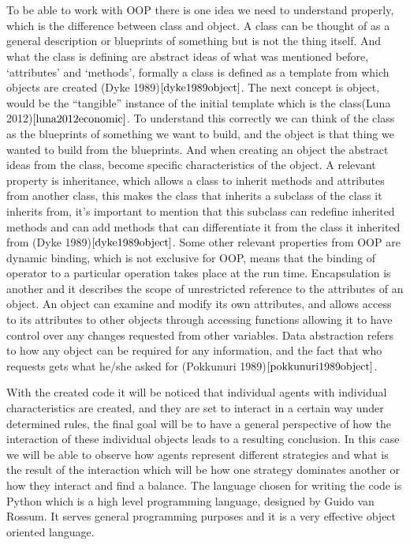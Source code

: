 \documentclass{article}
\begin{document}
\\\\To be able to work with OOP there is one idea we need to understand properly, which is the difference between class and object. A class can be thought of as a general description or blueprints of something but is not the thing itself.  And what the class is defining are abstract ideas of what was mentioned before, `attributes’ and `methods’, formally a class is defined as a template from which objects are created (Dyke 1989)$\cite{dyke1989object}$. The next concept is object,  would be the ``tangible'' instance of the initial template which is the class(Luna 2012)$\cite{luna2012economic}$. To understand this correctly we can think of the class as the blueprints of something we want to build, and the object is that thing we wanted to build from the blueprints. And when creating an object the abstract ideas from the class, become specific characteristics of the object. A relevant property is inheritance, which allows a class to inherit methods and attributes from another class, this makes the class that inherits a subclass of the class it inherits from, it’s important to mention that this subclass can redefine inherited methods and can add methods that can differentiate it from the class it inherited from (Dyke 1989)$\cite{dyke1989object}$.  Some other relevant properties from OOP are dynamic binding, which is not exclusive for OOP, means that the binding of operator to a particular operation takes place at the run time. Encapsulation is another and it describes the scope of unrestricted reference to the attributes of an object. An object can examine and modify its own attributes, and allows access to its attributes to other objects through accessing functions allowing it to have control over any changes requested from other variables. Data abstraction refers to how any object can be required for any information, and the fact that who requests gets what he/she asked for (Pokkunuri 1989)$\cite{pokkunuri1989object}$. 

With the created code it will be noticed that individual agents with individual characteristics are created, and they are set to interact in a certain way under determined rules, the final goal will be to have a general perspective of how the interaction of these individual objects leads to a resulting conclusion. In this case we will be able to observe how agents represent different strategies and what is the result of the interaction which will be how one strategy dominates another or how they interact and find a balance. The language chosen for writing the code is Python which is a high level programming language, designed by Guido van Rossum. It serves general programming purposes and it is a very effective object oriented language.
\end{document}
